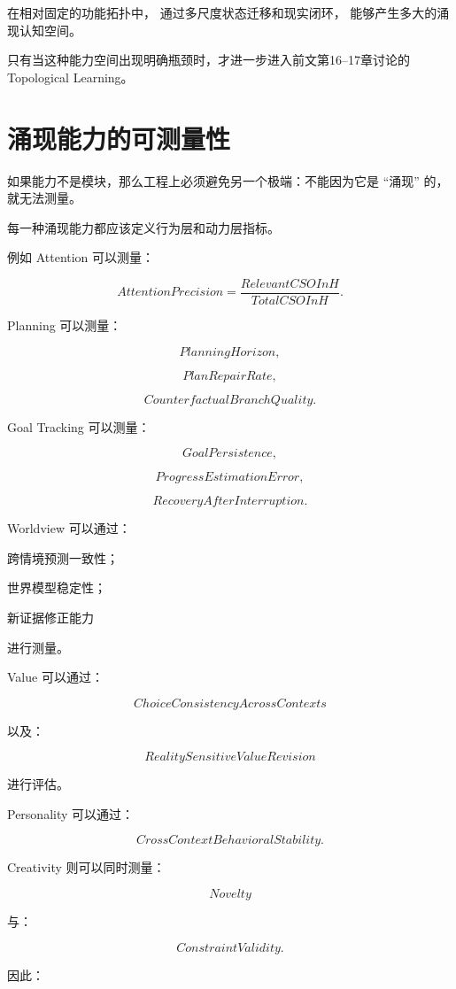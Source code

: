 \begin{statementbox}
在相对固定的功能拓扑中，
通过多尺度状态迁移和现实闭环，
能够产生多大的涌现认知空间。
\end{statementbox}

只有当这种能力空间出现明确瓶颈时，才进一步进入前文第16--17章讨论的 Topological Learning。

\section{涌现能力的可测量性}

如果能力不是模块，那么工程上必须避免另一个极端：不能因为它是 ``涌现'' 的，就无法测量。

每一种涌现能力都应该定义行为层和动力层指标。

例如 Attention 可以测量：

\[
AttentionPrecision
=
\frac{
RelevantCSOInH
}{
TotalCSOInH
}.
\]

Planning 可以测量：

\[
PlanningHorizon,
\]

\[
PlanRepairRate,
\]

\[
CounterfactualBranchQuality.
\]

Goal Tracking 可以测量：

\[
GoalPersistence,
\]

\[
ProgressEstimationError,
\]

\[
RecoveryAfterInterruption.
\]

Worldview 可以通过：

跨情境预测一致性；

世界模型稳定性；

新证据修正能力

进行测量。

Value 可以通过：

\[
ChoiceConsistencyAcrossContexts
\]

以及：

\[
RealitySensitiveValueRevision
\]

进行评估。

Personality 可以通过：

\[
CrossContextBehavioralStability.
\]

Creativity 则可以同时测量：

\[
Novelty
\]

与：

\[
ConstraintValidity.
\]

因此：

\begin{statementbox}
\centering
{}
\end{statementbox}

